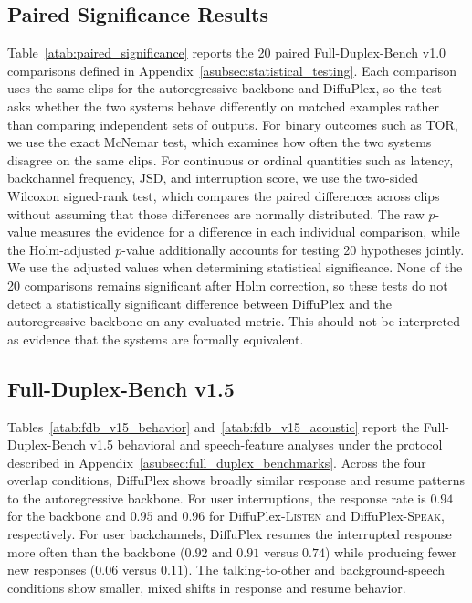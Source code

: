 \subsection{Paired Significance Results}
\label{asubsec:paired_significance}





Table~\ref{atab:paired_significance} reports the 20 paired Full-Duplex-Bench v1.0 comparisons defined in Appendix~\ref{asubsec:statistical_testing}.
Each comparison uses the same clips for the autoregressive backbone and DiffuPlex, so the test asks whether the two systems behave differently on matched examples rather than comparing independent sets of outputs.
For binary outcomes such as TOR, we use the exact McNemar test, which examines how often the two systems disagree on the same clips.
For continuous or ordinal quantities such as latency, backchannel frequency, JSD, and interruption score, we use the two-sided Wilcoxon signed-rank test, which compares the paired differences across clips without assuming that those differences are normally distributed.
The raw $p$-value measures the evidence for a difference in each individual comparison, while the Holm-adjusted $p$-value additionally accounts for testing 20 hypotheses jointly.
We use the adjusted values when determining statistical significance.
None of the 20 comparisons remains significant after Holm correction, so these tests do not detect a statistically significant difference between DiffuPlex and the autoregressive backbone on any evaluated metric.
This should not be interpreted as evidence that the systems are formally equivalent.




\subsection{Full-Duplex-Bench v1.5}
\label{asubsec:additional_full_duplex}

Tables~\ref{atab:fdb_v15_behavior} and~\ref{atab:fdb_v15_acoustic} report the Full-Duplex-Bench v1.5 behavioral and speech-feature analyses under the protocol described in Appendix~\ref{asubsec:full_duplex_benchmarks}.
Across the four overlap conditions, DiffuPlex shows broadly similar response and resume patterns to the autoregressive backbone.
For user interruptions, the response rate is $0.94$ for the backbone and $0.95$ and $0.96$ for DiffuPlex-\textsc{Listen} and DiffuPlex-\textsc{Speak}, respectively.
For user backchannels, DiffuPlex resumes the interrupted response more often than the backbone ($0.92$ and $0.91$ versus $0.74$) while producing fewer new responses ($0.06$ versus $0.11$).
The talking-to-other and background-speech conditions show smaller, mixed shifts in response and resume behavior.

